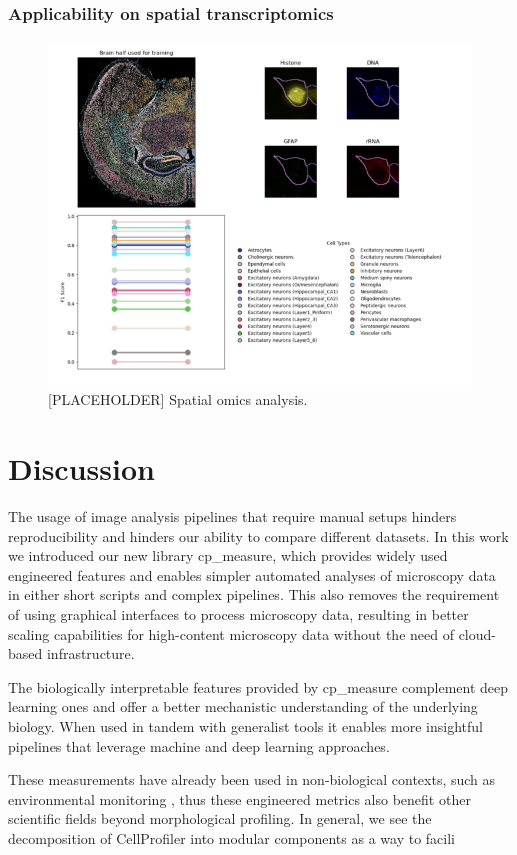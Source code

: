\documentclass{article}
\begin{document}
\subsubsection{Applicability on spatial transcriptomics}
\label{sec:org1d0d8b8}
\begin{figure}[htbp]
\centering
\includegraphics[width=.9\linewidth]{./figs/spatial.png}
\caption{\label{fig:org722dcf5}{[}PLACEHOLDER] Spatial omics analysis.}
\end{figure}
\section{Discussion}
\label{sec:orgf37b369}
The usage of image analysis pipelines that require manual setups hinders reproducibility and hinders our ability to compare different datasets. In this work we introduced our new library cp\_measure, which provides widely used engineered features and enables simpler automated analyses of microscopy data in either short scripts and complex pipelines. This also removes the requirement of using graphical interfaces to process microscopy data, resulting in better scaling capabilities for high-content microscopy data without the need of cloud-based infrastructure.

The biologically interpretable features provided by cp\_measure complement deep learning ones and offer a better mechanistic understanding of the underlying biology. When used in tandem with generalist tools it enables more insightful pipelines that leverage machine and deep learning approaches. 

These measurements have already been used in non-biological contexts, such as environmental monitoring \citep{ideharaExploringNileRed2025}, thus these engineered metrics also benefit other scientific fields beyond morphological profiling. In general, we see the decomposition of CellProfiler into modular components as a way to facili
\end{document}
